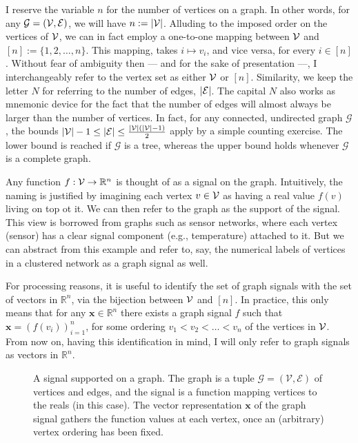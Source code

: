 I reserve the variable $n$ for the number of vertices on a graph. In other words, for any $\mathcal{G} = (\mathcal{V}, \mathcal{E})$, we will have $n := |\mathcal{V}|$. Alluding to the imposed order on the vertices of $\mathcal{V}$, we can in fact employ a one-to-one mapping between $\mathcal{V}$ and $[n] := \{1, 2, \dots, n\}$. This mapping, takes $i \mapsto v_i$, and vice versa, for every $i \in [n]$. Without fear of ambiguity then --- and for the sake of presentation ---, I interchangeably refer to the vertex set as either $\mathcal{V}$ or $[n]$. Similarity, we keep the letter $N$ for referring to the number of edges, $|\mathcal{E}|$. The capital $N$ also works as mnemonic device for the fact that the number of edges will almost always be larger than the number of vertices. In fact, for any connected, undirected graph $\mathcal{G}$, the bounds $|\mathcal{V}| - 1 \leq |\mathcal{E}| \leq \frac{|\mathcal{V}|(|\mathcal{V}| - 1)}{2}$ apply by a simple counting exercise. The lower bound is reached if $\mathcal{G}$ is a tree, whereas the upper bound holds whenever $\mathcal{G}$ is a complete graph.

Any function $f : \mathcal{V} \to \mathbb{R}^{n}$ is thought of as a signal on the graph. Intuitively, the naming is justified by imagining each vertex $v \in \mathcal{V}$ as having a real value $f(v)$ living on top ot it. We can then refer to the graph as the support of the signal. This view is borrowed from graphs such as sensor networks, where each vertex (sensor) has a clear signal component (e.g., temperature) attached to it. But we can abstract from this example and refer to, say, the numerical labels of vertices in a clustered network as a graph signal as well.

For processing reasons, it is useful to identify the set of graph signals with the set of vectors in $\mathbb{R}^{n}$, via the bijection between $\mathcal{V}$ and $[n]$. In practice, this only means that for any $\mathbf{x} \in \mathbb{R}^{n}$ there exists a graph signal $f$ such that $\mathbf{x} = \left( f(v_i) \right)_{i = 1}^n$, for some ordering $v_1 < v_2 < \dots < v_n$ of the vertices in $\mathcal{V}$. From now on, having this identification in mind, I will only refer to graph signals as vectors in $\mathbb{R}^{n}$.

\begin{figure}[H]
    \centering
    
    \caption[A signal supported on a graph]{A signal supported on a graph. The graph is a tuple $\mathcal{G} = (\mathcal{V}, \mathcal{E})$ of vertices and edges, and the signal is a function mapping vertices to the reals (in this case). The vector representation $\mathbf{x}$ of the graph signal gathers the function values at each vertex, once an (arbitrary) vertex ordering has been fixed.}
    \label{fig:graph-signal-example}
\end{figure}


